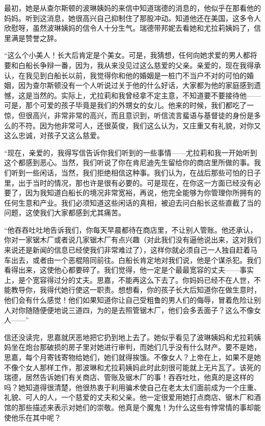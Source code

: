 \par 最初，她是从查尔斯顿的波琳姨妈的来信中知道瑞德的消息的，他似乎在那看他的妈妈。听到这消息，她很高兴自己抑制住了那股冲动。知道他还在美国，这多令人欣慰呀，虽然波琳姨妈的信令人十分生气。瑞德带邦妮去看她和尤拉莉姨妈了，信里满是赞誉之辞。
\par “这么个小美人！长大后肯定是个美女。可是，我猜想，任何向她求爱的男人都将要和白船长争辩一番，因为，我从来没见过这么慈爱的父亲。亲爱的，现在我得承认，在我见到白船长以前，我觉得你和他的婚姻是一桩门不当户不对的可怕的婚姻，因为查尔斯顿没有一个人听说过关于他的什么好话，大家都为他的家庭感到遗憾，这是当然的。实际上，尤拉莉和我曾经拿不定主意，不知道要不要接待他——可是，那个可爱的孩子毕竟是我们的外甥女的女儿。他来的时候，我们都吃了一惊，但很高兴，非常非常的高兴，而且意识到，听信流言蜚语与基督徒的身份是多么的不符。因为他非常可人，还很英俊，我们这么认为，又庄重又有礼貌，对你又这么忠诚，对孩子又这么慈爱。
\par “现在，亲爱的，我得写信告诉你我们听到的一些事情——尤拉莉和我一开始听到这个都感到恶心。当然，我们听说了你在肯尼迪先生留给你的商店里所做的事。我们听到一些闲话，当然，我们拒绝相信这种事。我们认为，在战后那些可怕的日子里，出于当时的情况，那也许是很有必要的。可是现在，在你这一方面已经没有必要了，因为我知道白船长的境况非常宽裕，再说，他完全能够为你管理你所拥有的任何生意和产业。我们必须知道这些闲话的真相，被迫去问白船长这些直截了当的问题，这使我们大家都感到尤其痛苦。
\par “他吞吞吐吐地告诉我们，你每天早晨都待在商店里，不让别人管账。他还承认，你对一家锯木厂或者说几家锯木厂有点兴趣（对此我们没有逼他说出来，这对我们来说还是新闻的信息已经使我们非常难过了），这样你就必须自己一人独自赶着马车出去，或者由一个恶棍陪同前往。白船长肯定地对我们说，他是个谋杀犯。我们看得出来，这使他心都要碎了。我们觉得，他一定是个最最宽容的丈夫——事实上，是个宽容得过分的丈夫。思嘉，不能再这么下去了。你妈妈已经不在人世，不能教导你，我得代她行使这一职责。想想看，你的孩子长大后知道你在做生意时，他们会有什么感觉！他们如果知道你让自己受粗鲁的男人们的侮辱，冒着危险让别人对你随随便便地说三道四，为的是去照管锯木厂，他们会多丢面子？这么不像女人——”
\par 信还没读完，思嘉就厌恶地把它扔到地上去了。她似乎看见了波琳姨妈和尤拉莉姨妈坐在炮台那破损的房子里对她进行审判，而她们几乎没有什么财产。要不是她，思嘉，每个月寄钱寄物给她们，她们就得挨饿。不像女人？上帝在上，如果不是她不像个女人那样工作，那波琳和尤拉莉姨妈此时此刻很可能就上无片瓦了。该死的瑞德，居然告诉她们有关商店、管账及锯木厂的事！吞吞吐吐，他真的是这样的吗？她知道得很清楚，他很热衷于利用骗术使自己在老太太们面前成为一个庄重、礼貌、可人的人，一个慈爱的丈夫和父亲。他一定很爱用她打点商店、锯木厂和酒馆的那些描述来表示对她们的崇敬。他真是个魔鬼！为什么这些有悖常情的事却能使他乐在其中呢？
